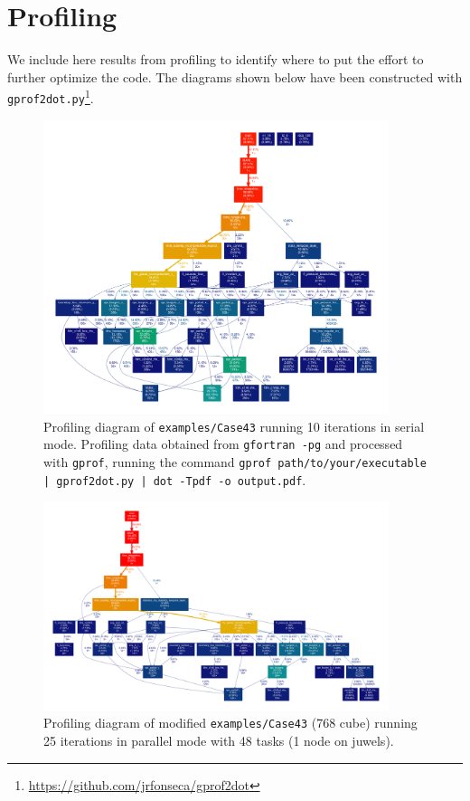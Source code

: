 \chapter{Profiling}\label{sec:profiling}

We include here results from profiling to identify where to put the effort to further optimize the code. The diagrams shown below have been constructed with {\tt gprof2dot.py}\footnote{\url{https://github.com/jrfonseca/gprof2dot}}.

\begin{figure}[H]
  \centering
  \includegraphics[clip,width=0.9\textwidth]{figs/profiling.pdf}
  \caption{Profiling diagram of {\tt examples/Case43} running 10 iterations in serial mode. Profiling data obtained from {\tt gfortran -pg} and processed with {\tt gprof}, running the command {\tt gprof path/to/your/executable | gprof2dot.py | dot -Tpdf -o output.pdf}.}
\end{figure}

\begin{figure}[H]
  \centering
  \includegraphics[clip,width=0.9\textwidth]{figs/profiling2.pdf}
  \caption{Profiling diagram of modified {\tt examples/Case43} (768 cube) running 25 iterations in parallel mode with 48 tasks (1 node on juwels).}
\end{figure}


